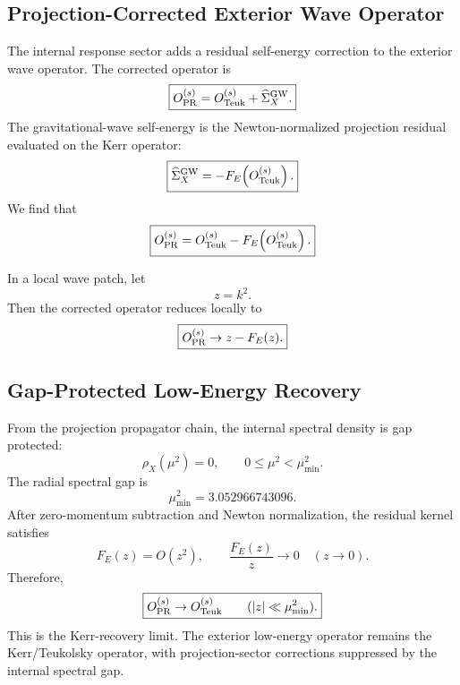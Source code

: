 \documentclass[11pt]{article}
\begin{document}
\subsection{Projection-Corrected Exterior Wave Operator}

The internal response sector adds a residual self-energy correction to the exterior wave operator. The corrected operator is
\begin{equation}
\boxed{
O_{\rm PR}^{(s)}
=
O_{\rm Teuk}^{(s)}
+
\widehat{\Sigma}_{X}^{\rm GW}.
}
\end{equation}
The gravitational-wave self-energy is the Newton-normalized projection residual evaluated on the Kerr operator:
\begin{equation}
\boxed{
\widehat{\Sigma}_{X}^{\rm GW}
=
-F_E\!\left(O_{\rm Teuk}^{(s)}\right).
}
\end{equation}
We find that
\begin{equation}
\boxed{
O_{\rm PR}^{(s)}
=
O_{\rm Teuk}^{(s)}
-
F_E\!\left(O_{\rm Teuk}^{(s)}\right).
}
\end{equation}

In a local wave patch, let
\begin{equation}
\boxed{
z
=
k^2.
}
\end{equation}
Then the corrected operator reduces locally to
\begin{equation}
\boxed{
O_{\rm PR}^{(s)}
\rightarrow
z-F_E(z).
}
\end{equation}

\subsection{Gap-Protected Low-Energy Recovery}

From the projection propagator chain, the internal spectral density is gap protected:
\begin{equation}
\boxed{
\rho_X(\mu^2)=0,
\qquad
0\leq\mu^2<\mu_{\min}^2.
}
\end{equation}
The radial spectral gap is
\begin{equation}
\boxed{
\mu_{\min}^2
=
3.052966743096.
}
\end{equation}
After zero-momentum subtraction and Newton normalization, the residual kernel satisfies
\begin{equation}
\boxed{
F_E(z)=O(z^2),
\qquad
\frac{F_E(z)}{z}\rightarrow0
\quad
(z\rightarrow0).
}
\end{equation}
Therefore,
\begin{equation}
\boxed{
O_{\rm PR}^{(s)}
\rightarrow
O_{\rm Teuk}^{(s)}
\qquad
(|z|\ll\mu_{\min}^2).
}
\end{equation}
This is the Kerr-recovery limit. The exterior low-energy operator remains the Kerr/Teukolsky operator, with projection-sector corrections suppressed by the internal spectral gap.
\end{document}
